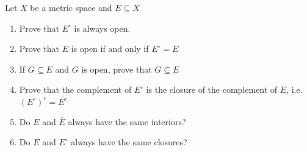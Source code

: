 Let $X$ be a metric space and $E \subseteq X$

\begin{enumerate}
	\item Prove that $E^{\circ}$ is always open.
	\item Prove that $E$ is open if and only if $E^{\circ} = E$
	\item If $G \subseteq E$ and $G$ is open, prove that $G \subseteq E$
	\item Prove that the complement of $E^{\circ}$ is the closure of the complement of $E$, i.e. $(E^{\circ})^c = \overline{E^c}$
	\item Do $E$ and $\overline{E}$ always have the same interiors?
	\item Do $E$ and $E^{\circ}$ always have the same closures?
\end{enumerate}